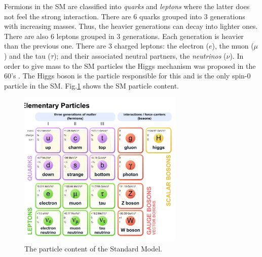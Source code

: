 Fermions in the SM are classified into \textit{quarks} and \textit{leptons} where the latter does not feel the strong interaction. There are 6 quarks grouped into 3 generations with increasing masses. Thus, the heavier generations can decay into lighter ones. There are also 6 leptons grouped in 3 generations. Each generation is heavier than the previous one. There are 3 charged leptons: the electron ($e$), the muon ($\mu$) and the tau ($\tau$); and their associated neutral partners, the \textit{neutrinos} ($\nu$). In order to give mass to the SM particles the Higgs mechanism was proposed in the 60's \cite{PhysRevLett.13.508,PhysRevLett.13.321,PhysRevLett.13.585}. The Higgs boson is the particle responsible for this and is the only spin-0 particle in the SM. Fig.\ref{Fig14} shows the SM particle content.
\begin{figure}[h]
	\centering
	\includegraphics[width=0.7\textwidth]{figures/Fig14}
	\caption{The particle content of the Standard Model.}
	\label{Fig14}
\end{figure}
